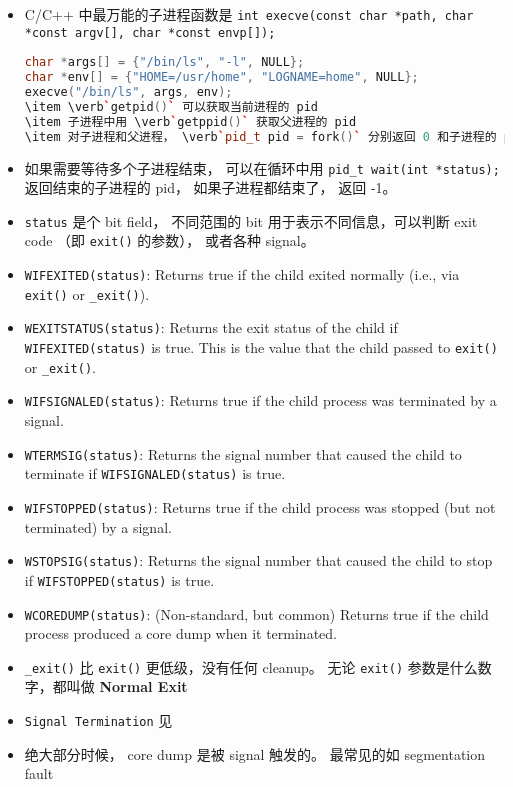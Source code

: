 \begin{itemize}
\item C/C++ 中最万能的子进程函数是 \verb`int execve(const char *path, char *const argv[], char *const envp[]);`
\begin{lstlisting}[language=cpp]
char *args[] = {"/bin/ls", "-l", NULL};
char *env[] = {"HOME=/usr/home", "LOGNAME=home", NULL};
execve("/bin/ls", args, env);
\item \verb`getpid()` 可以获取当前进程的 pid
\item 子进程中用 \verb`getppid()` 获取父进程的 pid
\item 对子进程和父进程， \verb`pid_t pid = fork()` 分别返回 0 和子进程的 pid。
\end{lstlisting}
\item 如果需要等待多个子进程结束， 可以在循环中用 \verb`pid_t wait(int *status);` 返回结束的子进程的 pid， 如果子进程都结束了， 返回 -1。
\item \verb`status` 是个 bit field， 不同范围的 bit 用于表示不同信息，可以判断 exit code （即 \verb`exit()` 的参数）， 或者各种 signal。
\item \verb`WIFEXITED(status)`: Returns true if the child exited normally (i.e., via \verb`exit()` or \verb`_exit()`).
\item \verb`WEXITSTATUS(status)`: Returns the exit status of the child if \verb`WIFEXITED(status)` is true. This is the value that the child passed to \verb`exit()` or \verb`_exit()`.
\item \verb`WIFSIGNALED(status)`: Returns true if the child process was terminated by a signal.
\item \verb`WTERMSIG(status)`: Returns the signal number that caused the child to terminate if \verb`WIFSIGNALED(status)` is true.
\item \verb`WIFSTOPPED(status)`: Returns true if the child process was stopped (but not terminated) by a signal.
\item \verb`WSTOPSIG(status)`: Returns the signal number that caused the child to stop if \verb`WIFSTOPPED(status)` is true.
\item \verb`WCOREDUMP(status)`: (Non-standard, but common) Returns true if the child process produced a core dump when it terminated.
\item \verb`_exit()` 比 \verb`exit()` 更低级，没有任何 cleanup。 无论 \verb`exit()` 参数是什么数字，都叫做 \textbf{Normal Exit}
\item \verb`Signal Termination` 见 
\item 绝大部分时候， core dump 是被 signal 触发的。 最常见的如 segmentation fault

\end{itemize}
